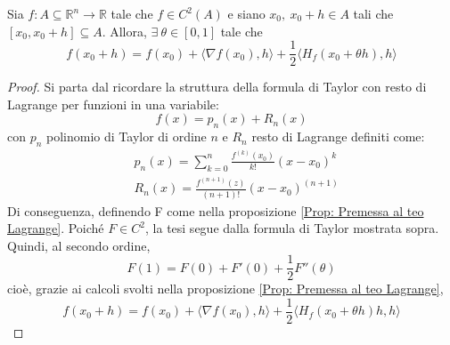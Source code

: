 \begin{theorem} \label{Teo: Taylor con resto di Lagrange}
    Sia $f:A \subseteq \mathbb{R}^n \to \mathbb{R}$ tale che $f\in C^2(A)$ e siano $x_0,\ x_0+h \in A$ tali che $[x_0, x_0+h] \subseteq A$. Allora, $\exists\ \theta \in [0,1]$ tale che
    \begin{equation}
        f(x_0+h)=f(x_0)+ \langle \nabla f(x_0), h \rangle + \frac{1}{2}\langle H_f(x_0+\theta h),h \rangle 
    \end{equation} 
    \begin{proof}
        Si parta dal ricordare la struttura della formula di Taylor con resto di Lagrange per funzioni in una variabile:
        \begin{equation}
            f(x)=p_n(x)+R_n(x)
        \end{equation}
        con $p_n$ polinomio di Taylor di ordine $n$ e $R_n$ resto di Lagrange definiti come:
        \begin{equation}
            \begin{aligned}
                &p_n(x)=\sum\limits_{k=0}^{n}{\frac{f^{(k)}(x_0)}{k!}(x-x_0)^k}\\
                &R_n(x)=\frac{f^{(n+1)}(z)}{(n+1)!}(x-x_0)^{(n+1)}
            \end{aligned}
        \end{equation}
        Di conseguenza, definendo F come nella proposizione \ref{Prop: Premessa al teo Lagrange}. Poiché $F \in C^2$, la tesi segue dalla formula di Taylor mostrata sopra.
        Quindi, al secondo ordine, 
        \begin{equation}
            F(1)=F(0)+F'(0)+\frac{1}{2}F''(\theta)
        \end{equation}
        cioè, grazie ai calcoli svolti nella proposizione \ref{Prop: Premessa al teo Lagrange}, 
        \begin{equation}
            f(x_0+h)= f(x_0)+\langle \nabla f(x_0), h \rangle + \frac{1}{2}\langle H_f(x_0+ \theta h)h, h\rangle
        \end{equation}
    \end{proof}
\end{theorem}
